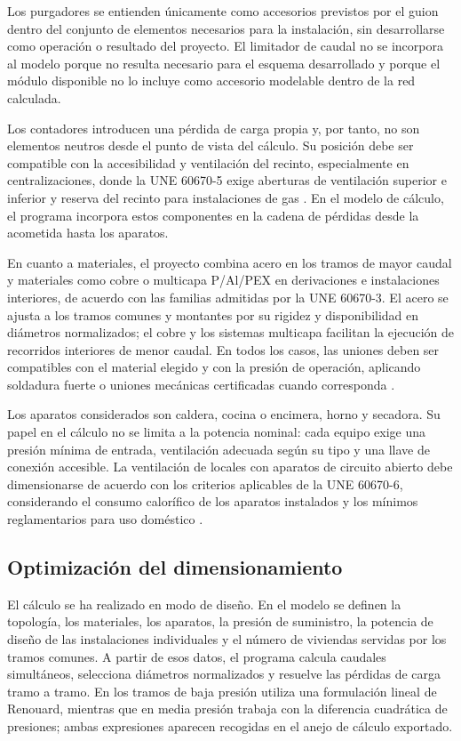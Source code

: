 \documentclass[12pt,a4paper]{article}
\begin{document}
Los purgadores se entienden únicamente como accesorios previstos por el guion dentro del conjunto de elementos necesarios para la instalación, sin desarrollarse como operación o resultado del proyecto. El limitador de caudal no se incorpora al modelo porque no resulta necesario para el esquema desarrollado y porque el módulo disponible no lo incluye como accesorio modelable dentro de la red calculada.

Los contadores introducen una pérdida de carga propia y, por tanto, no son elementos neutros desde el punto de vista del cálculo. Su posición debe ser compatible con la accesibilidad y ventilación del recinto, especialmente en centralizaciones, donde la UNE 60670-5 exige aberturas de ventilación superior e inferior y reserva del recinto para instalaciones de gas \cite{UNE60670_5_2023}. En el modelo de cálculo, el programa incorpora estos componentes en la cadena de pérdidas desde la acometida hasta los aparatos.

En cuanto a materiales, el proyecto combina acero en los tramos de mayor caudal y materiales como cobre o multicapa P/Al/PEX en derivaciones e instalaciones interiores, de acuerdo con las familias admitidas por la UNE 60670-3. El acero se ajusta a los tramos comunes y montantes por su rigidez y disponibilidad en diámetros normalizados; el cobre y los sistemas multicapa facilitan la ejecución de recorridos interiores de menor caudal. En todos los casos, las uniones deben ser compatibles con el material elegido y con la presión de operación, aplicando soldadura fuerte o uniones mecánicas certificadas cuando corresponda \cite{UNE60670_3_2023}.

Los aparatos considerados son caldera, cocina o encimera, horno y secadora. Su papel en el cálculo no se limita a la potencia nominal: cada equipo exige una presión mínima de entrada, ventilación adecuada según su tipo y una llave de conexión accesible. La ventilación de locales con aparatos de circuito abierto debe dimensionarse de acuerdo con los criterios aplicables de la UNE 60670-6, considerando el consumo calorífico de los aparatos instalados y los mínimos reglamentarios para uso doméstico \cite{UNE60670_6_2023}.

\subsection{Optimización del dimensionamiento}

El cálculo se ha realizado en modo de diseño. En el modelo se definen la topología, los materiales, los aparatos, la presión de suministro, la potencia de diseño de las instalaciones individuales y el número de viviendas servidas por los tramos comunes. A partir de esos datos, el programa calcula caudales simultáneos, selecciona diámetros normalizados y resuelve las pérdidas de carga tramo a tramo. En los tramos de baja presión utiliza una formulación lineal de Renouard, mientras que en media presión trabaja con la diferencia cuadrática de presiones; ambas expresiones aparecen recogidas en el anejo de cálculo exportado.
\end{document}
